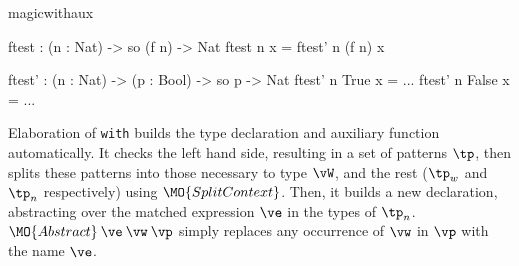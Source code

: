 \begin{SaveVerbatim}{magicwithaux}

ftest : (n : Nat) -> so (f n) -> Nat
ftest n x = ftest' n (f n) x

ftest' : (n : Nat) -> (p : Bool) -> so p -> Nat
ftest' n True  x = ... 
ftest' n False x = ... 

\end{SaveVerbatim}

\noindent
Elaboration of \texttt{with} builds the type declaration and auxiliary function
automatically. It checks the left hand side, resulting in a set of patterns
$\tp$, then splits these patterns into those necessary to type
$\vW$, and the rest ($\tp_w$ and $\tp_n$ respectively) using
$\MO{SplitContext}$. Then, it builds a new declaration, abstracting over
the matched expression $\ve$ in the types of $\tp_n$.
$\MO{Abstract}\:\ve\:\vw\:\vp$ simply replaces any occurrence of $\vw$ in
$\vp$ with the name $\ve$.


